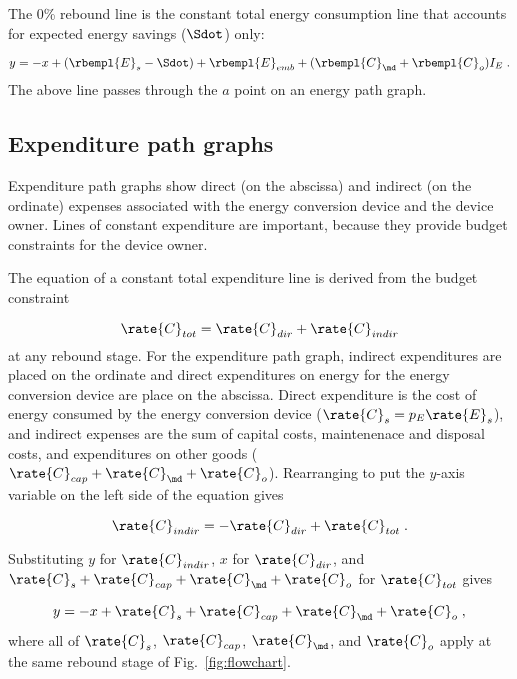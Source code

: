 The 0\% rebound line is the constant total energy consumption line 
that accounts for expected energy savings ($\Sdot$) only:

\begin{equation}
  y = -x + (\rbempl{E}_s - \Sdot)
          + \rbempl{E}_{emb} + (\rbempl{C}_{\md} + \rbempl{C}_o) I_E \; .
\end{equation}
%
The above line passes through the $a$ point on an energy path graph.


\subsection{Expenditure path graphs}
\label{sec:expenditure_path_graph_details}

Expenditure path graphs show direct (on the abscissa) and indirect (on the ordinate)
expenses associated with the energy conversion device 
and the device owner.
Lines of constant expenditure are important, 
because they provide budget constraints for the device owner.

The equation of a constant total expenditure line is derived from 
the budget constraint

\begin{equation}
  \rate{C}_{tot} = \rate{C}_{dir} + \rate{C}_{indir}
\end{equation}
%
at any rebound stage.
For the expenditure path graph,
indirect expenditures are placed on the ordinate
and direct expenditures on energy for the energy conversion device are place on the abscissa.
Direct expenditure is the cost of energy consumed by the energy conversion device
($\rate{C}_s = p_E \rate{E}_s$), and 
indirect expenses are the sum of capital costs, 
maintenenace and disposal costs, and 
expenditures on other goods
($\rate{C}_{cap} + \rate{C}_{\md} + \rate{C}_o$).
Rearranging to put the $y$-axis variable on the left side of the equation gives

\begin{equation}
  \rate{C}_{indir} = - \rate{C}_{dir} + \rate{C}_{tot} \; .
\end{equation}

Substituting $y$ for $\rate{C}_{indir}$, 
$x$ for $\rate{C}_{dir}$, and 
$\rate{C}_s + \rate{C}_{cap} + \rate{C}_{\md} + \rate{C}_o$ for $\rate{C}_{tot}$
gives

\begin{equation}
  y = -x + \rate{C}_s + \rate{C}_{cap} + \rate{C}_{\md} + \rate{C}_o \; ,
\end{equation}
%
where all of $\rate{C}_s$, $\rate{C}_{cap}$, $\rate{C}_{\md}$, and $\rate{C}_o$
apply at the same rebound stage of Fig.~\ref{fig:flowchart}.

